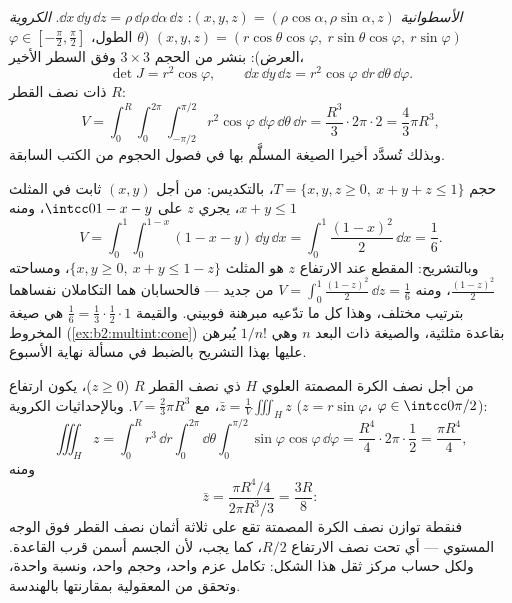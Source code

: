 \begin{example}\label{ex:b2:multint:spherical}
\emph{الأسطوانية} $(x, y, z) = (\rho\cos\alpha, \rho\sin\alpha,
z)$: $\dd x\,\dd y\,\dd z = \rho\,\dd\rho\,\dd\alpha\,\dd z$.
\emph{الكروية} $(x, y, z) = (r\cos\theta\cos\varphi,\
r\sin\theta\cos\varphi,\ r\sin\varphi)$ ($\theta$ الطول، $\varphi \in [-\frac\pi2, \frac\pi2]$ العرض): بنشر 
من الحجم $3
\times 3$ وفق السطر الأخير،
\[
\det J = r^2\cos\varphi ,
\qquad
\dd x\,\dd y\,\dd z
= r^2\cos\varphi\;\dd r\,\dd\theta\,\dd\varphi .
\]
 ذات نصف القطر $R$:
\[
V = \int_0^R\!\!\int_0^{2\pi}\!\!\int_{-\pi/2}^{\pi/2}
r^2\cos\varphi\;\dd\varphi\,\dd\theta\,\dd r
= \frac{R^3}{3}\cdot 2\pi \cdot 2
= \boxed{\frac43\pi R^3} ,
\]
وبذلك تُسدَّد أخيرا الصيغة المسلَّم بها في فصول الحجوم من الكتب
السابقة.
\end{example}

\begin{example}
\label{ex:b2:multint:tetra}
حجم $T = \{x, y, z \geq 0,\ x + y + z \leq 1\}$، بالتكديس: من أجل $(x, y)$ ثابت في المثلث $x + y \leq 1$، يجري
$z$ على $\intcc0{1 - x - y}$، ومنه
\[
V = \int_0^1\!\!\int_0^{1-x}(1 - x - y)\,\dd y\,\dd x
= \int_0^1\frac{(1 - x)^2}{2}\,\dd x = \frac16 .
\]
وبالتشريح: المقطع عند الارتفاع $z$ هو المثلث $\{x, y
\geq 0,\ x + y \leq 1 - z\}$، ومساحته
$\frac{(1-z)^2}2$، ومنه $V = \int_0^1\frac{(1-z)^2}2\,\dd z = \frac16$ من جديد --- فالحسابان هما التكاملان نفساهما
بترتيب مختلف، وهذا كل ما تدّعيه مبرهنة فوبيني. والقيمة $\frac16 =
\frac13\cdot\frac12\cdot1$ هي
صيغة المخروط (\cref{ex:b2:multint:cone}) بقاعدة مثلثية، والصيغة ذات البعد $n$
وهي $1/n!$ يُبرهن عليها بهذا التشريح بالضبط في مسألة نهاية الأسبوع.
\end{example}

\begin{example}\label{ex:b2:multint:centroid}
من أجل نصف الكرة المصمتة العلوي $H$ ذي نصف القطر $R$ ($z \geq 0$)،
يكون ارتفاع \omterm{def:b2:affine:barycenter}{مركز الثقل} $\bar z = \frac1{V}\iiint_H z$، مع $V =
\frac23\pi R^3$. وبالإحداثيات الكروية
($z =
r\sin\varphi$، $\varphi \in \intcc0{\pi/2}$):
\[
\iiint_H z
= \int_0^R r^3\,\dd r\int_0^{2\pi}\dd\theta
\int_0^{\pi/2}\sin\varphi\cos\varphi\,\dd\varphi
= \frac{R^4}4\cdot2\pi\cdot\frac12 = \frac{\pi R^4}4 ,
\]
ومنه
\[
\bar z = \frac{\pi R^4/4}{2\pi R^3/3} = \frac{3R}8 :
\]
فنقطة توازن نصف الكرة المصمتة تقع على ثلاثة أثمان نصف القطر فوق
الوجه المستوي --- أي تحت نصف الارتفاع $R/2$، كما يجب، لأن الجسم
أسمن قرب القاعدة. ولكل حساب مركز ثقل هذا الشكل: تكامل عزم واحد،
وحجم واحد، ونسبة واحدة، وتحقق من المعقولية بمقارنتها بالهندسة.
\end{example}

